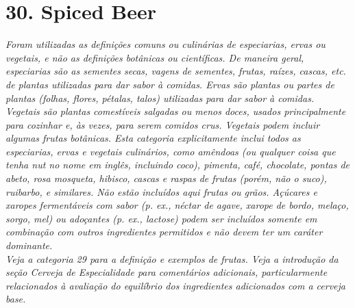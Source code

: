 \section*{30. Spiced Beer}
\textit{Foram utilizadas as definições comuns ou culinárias de especiarias, ervas ou vegetais, e não as definições botânicas ou científicas. De maneira geral, especiarias são as sementes secas, vagens de sementes, frutas, raízes, cascas, etc. de plantas utilizadas para dar sabor à comidas. Ervas são plantas ou partes de plantas (folhas, flores, pétalas, talos) utilizadas para dar sabor à comidas. Vegetais são plantas comestíveis salgadas ou menos doces, usados principalmente para cozinhar e, às vezes, para serem comidos crus. Vegetais podem incluir algumas frutas botânicas. Esta categoria explicitamente inclui todos as especiarias, ervas e vegetais culinários, como amêndoas (ou qualquer coisa que tenha nut no nome em inglês, incluindo coco), pimenta, café, chocolate, pontas de abeto, rosa mosqueta, hibisco, cascas e raspas de frutas (porém, não o suco), ruibarbo, e similares. Não estão incluídos aqui frutas ou grãos. Açúcares e xaropes fermentáveis com sabor (p. ex., néctar de agave, xarope de bordo, melaço, sorgo, mel) ou adoçantes (p. ex., lactose) podem ser incluídos somente em combinação com outros ingredientes permitidos e não devem ter um caráter dominante.}\\
\textit{Veja a categoria 29 para a definição e exemplos de frutas. Veja a introdução da seção Cerveja de Especialidade para comentários adicionais, particularmente relacionados à avaliação do equilíbrio dos ingredientes adicionados com a cerveja base.}
